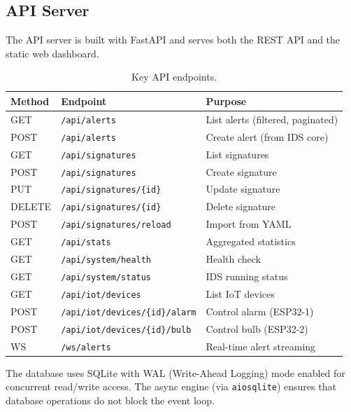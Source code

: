 \documentclass[12pt,a4paper]{article}
\begin{document}
\subsection{API Server}
\label{sec:api}

The API server is built with FastAPI and serves both the REST API and the static web dashboard.

\begin{table}[H]
\centering
\caption{Key API endpoints.}
\label{tab:endpoints}
\begin{tabular}{lll}
\toprule
\textbf{Method} & \textbf{Endpoint} & \textbf{Purpose} \\
\midrule
GET    & \texttt{/api/alerts}                     & List alerts (filtered, paginated) \\
POST   & \texttt{/api/alerts}                     & Create alert (from IDS core) \\
GET    & \texttt{/api/signatures}                 & List signatures \\
POST   & \texttt{/api/signatures}                 & Create signature \\
PUT    & \texttt{/api/signatures/\{id\}}          & Update signature \\
DELETE & \texttt{/api/signatures/\{id\}}          & Delete signature \\
POST   & \texttt{/api/signatures/reload}          & Import from YAML \\
GET    & \texttt{/api/stats}                      & Aggregated statistics \\
GET    & \texttt{/api/system/health}              & Health check \\
GET    & \texttt{/api/system/status}              & IDS running status \\
GET    & \texttt{/api/iot/devices}                & List IoT devices \\
POST   & \texttt{/api/iot/devices/\{id\}/alarm}   & Control alarm (ESP32-1) \\
POST   & \texttt{/api/iot/devices/\{id\}/bulb}    & Control bulb (ESP32-2) \\
WS     & \texttt{/ws/alerts}                      & Real-time alert streaming \\
\bottomrule
\end{tabular}
\end{table}

The database uses SQLite with WAL (Write-Ahead Logging) mode enabled for concurrent read/write access. The async engine (via \texttt{aiosqlite}) ensures that database operations do not block the event loop.
\end{document}
